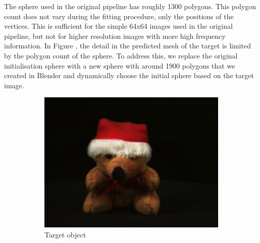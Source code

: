 \documentclass{article}
\begin{document}
The sphere used in the original pipeline has roughly 1300 polygons. This polygon count does not vary during the fitting procedure, only the positions of the vertices. This is sufficient for the simple 64x64 images used in the original pipeline, but not for higher resolution images with more high frequency information. In Figure , the detail in the predicted mesh of the target is limited by the polygon count of the sphere. To address this, we replace the original initialisation sphere with a new sphere with around 1900 polygons that we created in Blender and dynamically choose the initial sphere based on the target image.

\begin{figure}[h!]
  \centering
  \begin{subfigure}{0.25\textwidth}
    \centering
    \includegraphics[width=\textwidth]{images/teddy.png}
    \caption{Target object}
    \label{teddy}
  \end{subfigure}
  \hfill
  \begin{subfigure}{0.25\textwidth}
    \centering

\end{subfigure}
\end{figure}
\end{document}
